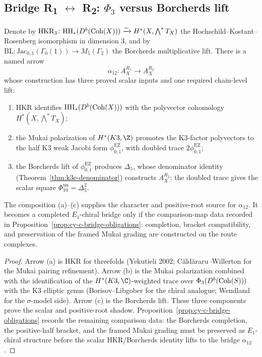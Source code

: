 \subsection{\texorpdfstring{Bridge R\textsubscript{1} $\leftrightarrow$ R\textsubscript{2}: $\Phi_3$ versus Borcherds lift}{Bridge R1 <-> R2: Phi-3 versus Borcherds lift}}

\begin{proposition}
\label{prop:route1-route2-bridge}
Denote by $\mathrm{HKR}_3 \colon \mathrm{HH}_*(D^b(\mathrm{Coh}(X))) \xrightarrow{\sim} H^*(X, \bigwedge^* T_X)$ the Hochschild--Kostant--Rosenberg isomorphism in dimension $3$, and by $\mathrm{BL} \colon \mathrm{Jac}_{0,1}(\Gamma_0(1)) \to M_5(\Gamma_2)$ the Borcherds multiplicative lift. There is a named arrow
\[
 \alpha_{12} \colon A_X^{R_1} \longrightarrow A_X^{R_2}
\]
whose construction has three proved scalar inputs and one required
chain-level lift:
\begin{enumerate}[label=\textup{(\alph*)}]
 \item HKR identifies $\mathrm{HH}_*(D^b(\mathrm{Coh}(X)))$ with the polyvector cohomology $H^*(X, \bigwedge^* T_X)$;
 \item the Mukai polarization of $H^*(K3, \Z)$ promotes the K3-factor polyvectors to the half K3 weak Jacobi form \(\phi_{0,1}^{\mathrm{EZ}}\), with doubled trace \(2\phi_{0,1}^{\mathrm{EZ}}\);
 \item the Borcherds lift of \(\phi_{0,1}^{\mathrm{EZ}}\) produces
 \(\Delta_5\), whose denominator identity
 (Theorem~\ref{thm:k3e-denominator}) constructs $A_X^{R_2}$; the doubled trace gives the scalar square
 \(\Phi_{10}^{\mathrm{un}}=\Delta_5^2\).
\end{enumerate}
The composition (a)--(c) supplies the character and positive-root source
for $\alpha_{12}$. It becomes a completed \(E_1\)-chiral bridge only if
the comparison-map data recorded in
Proposition~\ref{prop:cy-c-bridge-obligations}: completion, bracket
compatibility, and preservation of the framed Mukai grading are
constructed on the route complexes.
\end{proposition}

\begin{proof}
Arrow (a) is HKR for threefolds (Yekutieli 2002; C\u{a}ld\u{a}raru--Willerton for the Mukai pairing refinement). Arrow (b) is the Mukai polarization combined with the identification of the $H^*(K3, \C)$-weighted trace over $\Phi_3(D^b(\mathrm{Coh}(S)))$ with the K3 elliptic genus (Borisov--Libgober for the chiral analogue; Wendland for the $\sigma$-model side). Arrow (c) is the Borcherds lift. These three components prove the scalar and positive-root shadow. Proposition~\ref{prop:cy-c-bridge-obligations} records the remaining comparison data: the Borcherds completion, the positive-half bracket, and the framed Mukai grading must be preserved as $E_1$-chiral structure before the scalar HKR/Borcherds identity lifts to the bridge $\alpha_{12}$.
\end{proof}

